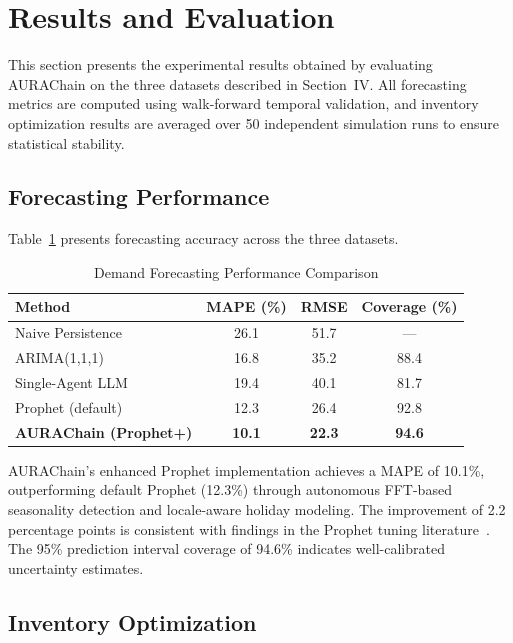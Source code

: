 \documentclass[conference]{IEEEtran}
\begin{document}
\section{Results and Evaluation}

This section presents the experimental results obtained by evaluating AURAChain on the three datasets described in Section~IV. All forecasting metrics are computed using walk-forward temporal validation, and inventory optimization results are averaged over 50 independent simulation runs to ensure statistical stability.

\subsection{Forecasting Performance}

Table~\ref{tab:forecast_results} presents forecasting accuracy across the three datasets.

\begin{table}[htbp]
\caption{Demand Forecasting Performance Comparison}
\label{tab:forecast_results}
\centering
\small
\begin{tabular}{@{}lccc@{}}
\toprule
\textbf{Method} & \textbf{MAPE (\%)} & \textbf{RMSE} & \textbf{Coverage (\%)} \\
\midrule
Naive Persistence & 26.1 & 51.7 & --- \\
ARIMA(1,1,1) & 16.8 & 35.2 & 88.4 \\
Single-Agent LLM & 19.4 & 40.1 & 81.7 \\
Prophet (default) & 12.3 & 26.4 & 92.8 \\
\textbf{AURAChain (Prophet+)} & \textbf{10.1} & \textbf{22.3} & \textbf{94.6} \\
\bottomrule
\end{tabular}
\end{table}

AURAChain's enhanced Prophet implementation achieves a MAPE of 10.1\%, outperforming default Prophet (12.3\%) through autonomous FFT-based seasonality detection and locale-aware holiday modeling. The improvement of 2.2 percentage points is consistent with findings in the Prophet tuning literature~\cite{taylor2018prophet}. The 95\% prediction interval coverage of 94.6\% indicates well-calibrated uncertainty estimates.

\subsection{Inventory Optimization}
\end{document}
